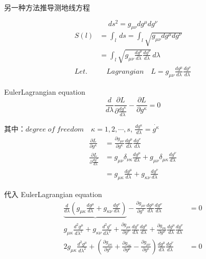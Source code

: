 \documentclass[12pt, a4paper, oneside, UTF8]{ctexbook}  %
\newcommand{\pa}{\partial}
\begin{document}
\begin{example}
    另一种方法推导测地线方程
    \begin{tui}
        \[
        ds^2=g_{\mu\nu}dg^\mu dg^\nu
        \]
        \begin{align*}
            S(l)&=\int_{l}\,ds=\int_{l}\sqrt{g_{\mu\nu}dg^\mu dg^\nu}\\
            &=\int_{l}\sqrt{g_{\mu\nu}\frac{dg^\mu}{d\lambda}\frac{dg^\nu}{d\lambda}}\,d\lambda\\
            Let.&\quad Lagrangian\quad L=g_{\mu\nu}\frac{dg^\mu}{d\lambda}\frac{dg^\nu}{d\lambda}
        \end{align*}

        Euler\textminus Lagrangian equation
        \[\frac{d}{d\lambda}\frac{\pa L}{\pa\frac{dg^\kappa}{d\lambda}}
        -\frac{\pa L}{\pa g^\kappa}=0
        \]

        其中：\(degree\; of\; freedom\quad\kappa=1,2,\cdots,s\),
        \(\frac{dg^\kappa}{d\lambda}=\dot{g^\kappa}\)
        \begin{align*}
            \frac{\pa L}{\pa g^\kappa}
            &=\frac{\pa g_{\mu\nu}}{\pa g^\kappa}\frac{dg^\mu}{d\lambda}\frac{dg^\nu}{d\lambda}\\
            \frac{\pa L}{\pa\frac{dg^\kappa}{d\lambda}}
            &=g_{\mu\nu}\delta_{\nu\kappa}\frac{dg^\mu}{d\lambda}
            +g_{\mu\nu}\delta_{\mu\kappa}\frac{dg^\nu}{d\lambda}\\
            &=g_{\mu\kappa}\frac{dg^\mu}{d\lambda}+g_{\kappa\nu}\frac{dg^\nu}{d\lambda}
        \end{align*}

        代入 Euler\textminus Lagrangian equation
        \begin{align*}
            \underbrace{\frac{d}{d\lambda}\left(
                g_{\mu\kappa}\frac{dg^\mu}{d\lambda}+g_{\kappa\nu}\frac{dg^\nu}{d\lambda}
            \right)}
            -\frac{\pa g_{\mu\nu}}{\pa g^\kappa}\frac{dg^\mu}{d\lambda}\frac{dg^\nu}{d\lambda}&=0\\
            g_{\mu\kappa}\frac{d^2g^\mu}{d\lambda^2}
            +g_{\kappa\nu}\frac{d^2g^\nu}{d\lambda^2}
            +\frac{\pa g_{\mu\kappa}}{\pa g^\nu}\frac{dg^\nu}{d\lambda}\frac{dg^\mu}{d\lambda}
            +\frac{\pa g_{\nu\kappa}}{\pa g^\mu}\frac{dg^\mu}{d\lambda}\frac{dg^\nu}{d\lambda}\\
            2g_{\mu\kappa}\frac{d^2g^\mu}{d\lambda^2}
            +\left(\frac{\pa g_{\mu\kappa}}{\pa g^\nu}
            +\frac{\pa g_{\nu\kappa}}{\pa g^\mu}
            -\frac{\pa g_{\mu\nu}}{\pa g^\kappa}\right)
            \frac{dg^\mu}{d\lambda}\frac{dg^\nu}{d\lambda}&=0   
        \end{align*}


\end{tui}
\end{example}
\end{document}
